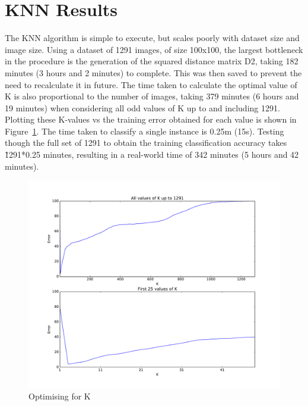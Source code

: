 \section{KNN Results}
The KNN algorithm is simple to execute, but scales poorly with dataset size and image size. Using a dataset of 1291 images, of size 100x100, the largest bottleneck in the procedure is the generation of the squared distance matrix D2, taking 182 minutes (3 hours and 2 minutes) to complete. This was then saved to prevent the need to recalculate it in future. The time taken to calculate the optimal value of K is also proportional to the number of images, taking 379 minutes (6 hours and 19 minutes) when considering all odd values of K up to and including 1291. Plotting these K-values vs the training error obtained for each value is shown in Figure~\ref{fig:k_values}. The time taken to classify a single instance is 0.25m (15s). Testing though the full set of 1291 to obtain the training classification accuracy takes \~1291*0.25 minutes, resulting in a real-world time of 342 minutes (5 hours and 42 minutes). 

\begin{figure}
	\centering
	\includegraphics[width=\textwidth]{figures/k_values1291}
	\caption{Optimising for K}
	\label{fig:k_values}
	\centering
\end{figure}


